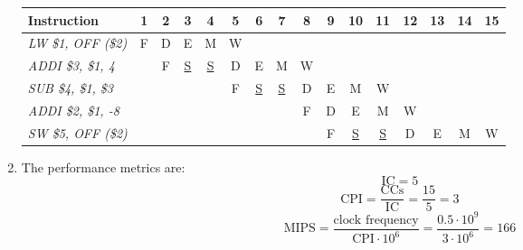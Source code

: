 \begin{enumerate}
\begin{table}[H]
\begin{tabular}{l|ccccccccccccccc}
            \textbf{Instruction}        & \textbf{1} & \textbf{2} & \textbf{3} & \textbf{4} & \textbf{5} & \textbf{6} & \textbf{7} & \textbf{8} & \textbf{9} & \textbf{10} & \textbf{11} & \textbf{12} & \textbf{13} & \textbf{14} & \textbf{15} \\ \hline
            \textit{LW \$1, OFF (\$2)}  & F          & D          & E          & M          & W          &            &            &            &            &             &             &             &             &             &             \\
            \textit{ADDI \$3, \$1, 4}   &            & F          & \underline{S}    & \underline{S}     & D          & E          & M          & W          &            &             &             &             &             &             &             \\
            \textit{SUB \$4, \$1, \$3}  &            &            &            &            & F          & \underline{S}     & \underline{S}     & D          & E          & M           & W           &             &             &             &             \\
            \textit{ADDI \$2, \$1, -8}  &            &            &            &            &            &            &            & F          & D          & E           & M           & W           &             &             &             \\
            \textit{SW \$5, OFF (\$2)}  &            &            &            &            &            &            &            &            & F          & \underline{S}      & \underline{S}      & D           & E           & M           & W          
            \end{tabular}
        \end{table}
    \item The performance metrics are: 
        \[\text{IC}=5\]
        \[\text{CPI}=\dfrac{\text{CCs}}{\text{IC}}=\dfrac{15}{5}=3\]
        \[\text{MIPS}=\dfrac{\text{clock frequency}}{\text{CPI} \cdot 10^6}=\dfrac{0.5\cdot 10^9}{3 \cdot 10^6}=166\]
\end{enumerate}